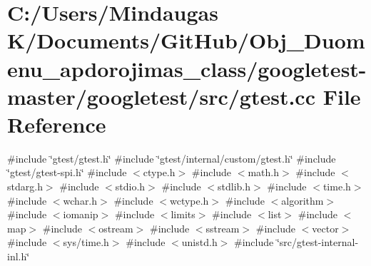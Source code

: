 \hypertarget{googletest-master_2googletest_2src_2gtest_8cc}{}\section{C\+:/\+Users/\+Mindaugas K/\+Documents/\+Git\+Hub/\+Obj\+\_\+\+Duomenu\+\_\+apdorojimas\+\_\+class/googletest-\/master/googletest/src/gtest.cc File Reference}
\label{googletest-master_2googletest_2src_2gtest_8cc}
{\ttfamily \#include \char`\"{}gtest/gtest.\+h\char`\"{}}\newline
{\ttfamily \#include \char`\"{}gtest/internal/custom/gtest.\+h\char`\"{}}\newline
{\ttfamily \#include \char`\"{}gtest/gtest-\/spi.\+h\char`\"{}}\newline
{\ttfamily \#include $<$ctype.\+h$>$}\newline
{\ttfamily \#include $<$math.\+h$>$}\newline
{\ttfamily \#include $<$stdarg.\+h$>$}\newline
{\ttfamily \#include $<$stdio.\+h$>$}\newline
{\ttfamily \#include $<$stdlib.\+h$>$}\newline
{\ttfamily \#include $<$time.\+h$>$}\newline
{\ttfamily \#include $<$wchar.\+h$>$}\newline
{\ttfamily \#include $<$wctype.\+h$>$}\newline
{\ttfamily \#include $<$algorithm$>$}\newline
{\ttfamily \#include $<$iomanip$>$}\newline
{\ttfamily \#include $<$limits$>$}\newline
{\ttfamily \#include $<$list$>$}\newline
{\ttfamily \#include $<$map$>$}\newline
{\ttfamily \#include $<$ostream$>$}\newline
{\ttfamily \#include $<$sstream$>$}\newline
{\ttfamily \#include $<$vector$>$}\newline
{\ttfamily \#include $<$sys/time.\+h$>$}\newline
{\ttfamily \#include $<$unistd.\+h$>$}\newline
{\ttfamily \#include \char`\"{}src/gtest-\/internal-\/inl.\+h\char`\"{}}\newline
